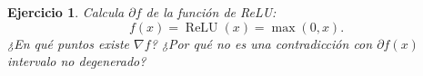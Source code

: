 \documentclass[11pt]{report}
\newtheorem{ex}{Ejercicio}
\begin{document}






\begin{ex}
Calcula \( \partial f \) de la función de ReLU:
\[
f(x) = \operatorname{ReLU}(x) = \max(0, x).
\]
¿En qué puntos existe \( \nabla f \)? ¿Por qué no es una contradicción con \( \partial f(x) \) intervalo no degenerado?
\end{ex}




\end{document}
